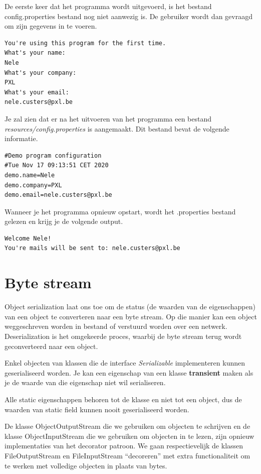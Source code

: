 \documentclass{tstextbook}
\begin{document}
De eerste keer dat het programma wordt uitgevoerd, is het bestand config.properties bestand nog niet aanwezig is. De gebruiker wordt dan gevraagd om zijn gegevens in te voeren.

\begin{verbatim}
You're using this program for the first time.
What's your name:
Nele
What's your company:
PXL
What's your email:
nele.custers@pxl.be
\end{verbatim}

Je zal zien dat er na het uitvoeren van het programma een bestand \textit{resources/config.properties} is aangemaakt.
Dit bestand bevat de volgende informatie.

\begin{verbatim}
#Demo program configuration
#Tue Nov 17 09:13:51 CET 2020
demo.name=Nele
demo.company=PXL
demo.email=nele.custers@pxl.be
\end{verbatim}
Wanneer je het programma opnieuw opstart, wordt het .properties bestand gelezen en krijg je de volgende output.

\begin{verbatim}
Welcome Nele!
You're mails will be sent to: nele.custers@pxl.be
\end{verbatim}


\section{Byte stream}

Object serialization laat ons toe om de status (de waarden van de eigenschappen) van een object te converteren naar een byte stream. Op die manier kan een object weggeschreven worden in bestand of verstuurd worden over een netwerk.
Deserialization is het omgekeerde proces, waarbij de byte stream terug wordt geconverteerd naar een object.

Enkel objecten van klassen die de interface \textit{Serializable} implementeren kunnen geserialiseerd worden.
Je kan een eigenschap van een klasse \textbf{transient} maken als je de waarde van die eigenschap niet wil serialiseren.

Alle static eigenschappen behoren tot de klasse en niet tot een object, dus de waarden van static field kunnen nooit geserialiseerd worden. 

De klasse ObjectOutputStream die we gebruiken om objecten te schrijven en de klasse ObjectInputStream die we gebruiken om objecten in te lezen, zijn opnieuw implementaties van het decorator patroon. We gaan respectievelijk de klassen FileOutputStream en FileInputStream ``decoreren'' met extra functionaliteit om te werken met volledige objecten in plaats van bytes. 
\end{document}
